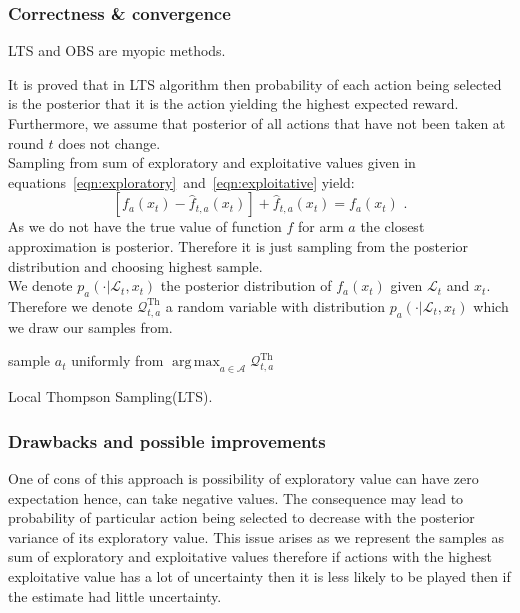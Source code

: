 \documentclass[12pt, a4paper, pdflatex, leqno]{report}
\begin{document}
\subsubsection{Correctness \& convergence}
LTS and OBS are myopic methods.

It is proved that in LTS algorithm then probability of each action being selected is the posterior that it is the action yielding the highest expected reward.\\

Furthermore, we assume that posterior of all actions that have not been taken at round $t$ does not change.\\

Sampling from sum of exploratory and exploitative values given in equations~\ref{eqn:exploratory}~and~\ref{eqn:exploitative} yield:
$$
  \left[ f_a(x_t) - \hat{f}_{t,a}(x_t) \right] + \hat{f}_{t,a}(x_t) = f_a(x_t) \text{ .}
$$
As we do not have the true value of function $f$ for arm $a$ the closest approximation is posterior. Therefore it is just sampling from the posterior distribution and choosing highest sample.\\

We denote $p_a(\cdot | \mathscr{L}_t, x_t)$ the posterior distribution of $f_a(x_t)$ given $\mathscr{L}_t$ and $x_t$. Therefore we denote $\mathscr{Q}^\text{Th}_{t,a}$ a random variable with distribution $p_a(\cdot | \mathscr{L}_t, x_t)$ which we draw our samples from.

\vspace{2cm}
\begin{algorithm}[H]
  sample $a_t$ uniformly from $\operatorname{arg\,max}_{a \in \mathscr{A}} \mathscr{Q}^\text{Th}_{t,a}$ \;
 \caption{Local Thompson Sampling(LTS).\label{al:LTS}}
\end{algorithm}
\vspace{2cm}


\subsubsection{Drawbacks and possible improvements}
One of cons of this approach is possibility of exploratory value can have zero expectation hence, can take negative values. The consequence may lead to probability of particular action being selected to decrease with the posterior variance of its exploratory value. This issue arises as we represent the samples as sum of exploratory and exploitative values therefore if actions with the highest exploitative value has a lot of uncertainty then it is less likely to be played then if the estimate had little uncertainty.\\
\end{document}
